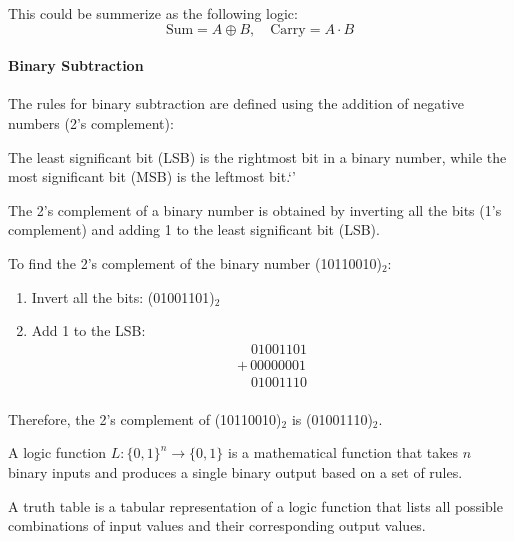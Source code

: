 \documentclass[11pt]{report}
\begin{document}
This could be summerize as the following logic:
\begin{equation}
    \text{Sum} = A \oplus B, \quad \text{Carry} = A \cdot B
\end{equation}
\paragraph{Binary Subtraction} The rules for binary subtraction are defined using the addition of negative numbers (2's complement):

\begin{definition}
    The least significant bit (LSB) is the rightmost bit in a binary number, while the most significant bit (MSB) is the leftmost bit.`'
    
\end{definition}
\begin{definition}[2's Complement]
    The 2's complement of a binary number is obtained by inverting all the bits (1's complement) and adding 1 to the least significant bit (LSB).
\end{definition}

\begin{example}
    To find the 2's complement of the binary number (10110010)$_2$:
    \begin{enumerate}
        \item Invert all the bits: (01001101)$_2$
        \item Add 1 to the LSB: 
        \[
        \begin{array}{c}
        \quad 01001101 \\
        +\, 00000001 \\
        \hline
        \quad 01001110 \\
        \end{array}
        \]
    \end{enumerate}
    Therefore, the 2's complement of (10110010)$_2$ is (01001110)$_2$.
\end{example}

\begin{definition}
    A logic function $L: \{0,1\}^n \rightarrow \{0,1\}$ is a mathematical function that takes $n$ binary inputs and produces a single binary output based on a set of rules.
\end{definition}

\begin{definition}
    A truth table is a tabular representation of a logic function that lists all possible combinations of input values and their corresponding output values.
    
\end{definition}
\end{document}
